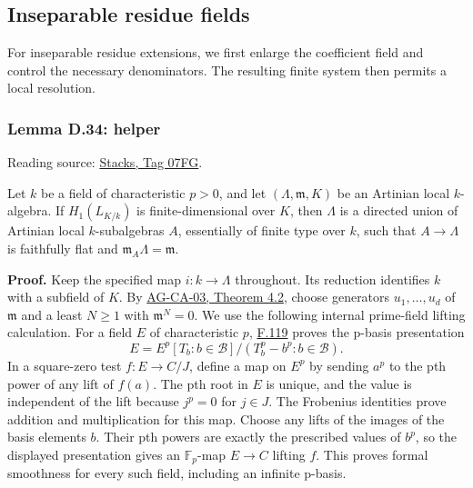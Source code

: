 \documentclass[11pt,a4paper,openany]{report}
\begin{document}
\subsection{Inseparable residue fields}\label{AG-RG-S05-inseparable-residue-fields}

\label{AG-RG-S05-smoothing-section-inseparable}

For inseparable residue extensions, we first enlarge the coefficient field and control the necessary denominators. The resulting finite system then permits a local resolution.

\label{AG-RG-S05-smoothing-lemma-helper}

\subsubsection{Lemma D.34: helper}\label{AG-RG-S05-lemma-d.34-helper}

Reading source: \href{https://stacks.math.columbia.edu/tag/07FG}{Stacks, Tag 07FG}.

Let \(k\) be a field of characteristic \(p>0\), and let \((\Lambda,\mathfrak m,K)\) be an Artinian local \(k\)-algebra. If \(H_1(L_{K/k})\) is finite-dimensional over \(K\), then \(\Lambda\) is a directed union of Artinian local \(k\)-subalgebras \(A\), essentially of finite type over \(k\), such that \(A\to\Lambda\) is faithfully flat and \(\mathfrak m_A\Lambda=\mathfrak m\).

\textbf{Proof.} Keep the specified map \(i:k\to\Lambda\) throughout. Its reduction identifies \(k\) with a subfield of \(K\). By \href{https://github.com/KokunoYumeto/open-math-courses/blob/d02d0a3669f42579db037cd44de1d113fdd770a1/docs/courses/AG-CA/src/noetherian-and-artinian-rings.md}{AG-CA-03, Theorem 4.2}, choose generators \(u_1,\ldots,u_d\) of \(\mathfrak m\) and a least \(N\ge1\) with \(\mathfrak m^N=0\). We use the following internal prime-field lifting calculation. For a field \(E\) of characteristic \(p\), \hyperref[AG-RG-S05-more-algebra-lemma-p-basis]{F.119} proves the p-basis presentation \[
E=E^p[T_b:b\in\mathcal B]/(T_b^p-b^p:b\in\mathcal B).
\] In a square-zero test \(f:E\to C/J\), define a map on \(E^p\) by sending \(a^p\) to the pth power of any lift of \(f(a)\). The pth root in \(E\) is unique, and the value is independent of the lift because \(j^p=0\) for \(j\in J\). The Frobenius identities prove addition and multiplication for this map. Choose any lifts of the images of the basis elements \(b\). Their pth powers are exactly the prescribed values of \(b^p\), so the displayed presentation gives an \(\mathbb F_p\)-map \(E\to C\) lifting \(f\). This proves formal smoothness for every such field, including an infinite p-basis.
\end{document}

